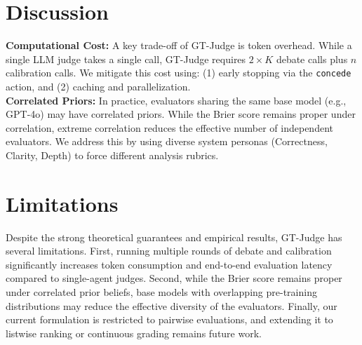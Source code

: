 \documentclass[11pt,a4paper]{article}
\begin{document}
\begin{table}[h]
\centering
\caption{GT-Judge Empirical Benchmark Evaluation Results (Mock LLM Mode)}
\label{tab:results}
\end{table}

\section{Discussion}
\textbf{Computational Cost:} A key trade-off of GT-Judge is token overhead. While a single LLM judge takes a single call, GT-Judge requires $2 \times K$ debate calls plus $n$ calibration calls. We mitigate this cost using: (1) early stopping via the \texttt{concede} action, and (2) caching and parallelization.
\\
\textbf{Correlated Priors:} In practice, evaluators sharing the same base model (e.g., GPT-4o) may have correlated priors. While the Brier score remains proper under correlation, extreme correlation reduces the effective number of independent evaluators. We address this by using diverse system personas (Correctness, Clarity, Depth) to force different analysis rubrics.

\section{Limitations}
Despite the strong theoretical guarantees and empirical results, GT-Judge has several limitations. First, running multiple rounds of debate and calibration significantly increases token consumption and end-to-end evaluation latency compared to single-agent judges. Second, while the Brier score remains proper under correlated prior beliefs, base models with overlapping pre-training distributions may reduce the effective diversity of the evaluators. Finally, our current formulation is restricted to pairwise evaluations, and extending it to listwise ranking or continuous grading remains future work.
\end{document}

